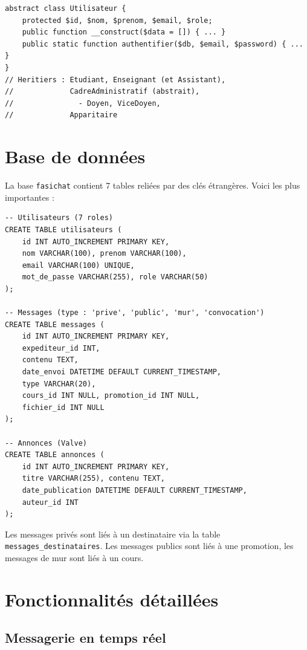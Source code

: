\documentclass[12pt,a4paper]{article}
\begin{document}
\begin{lstlisting}[style=phpphp, caption=Classes utilisateur]
abstract class Utilisateur {
    protected $id, $nom, $prenom, $email, $role;
    public function __construct($data = []) { ... }
    public static function authentifier($db, $email, $password) { ... }
}
// Heritiers : Etudiant, Enseignant (et Assistant),
//             CadreAdministratif (abstrait),
//               - Doyen, ViceDoyen,
//             Apparitaire
\end{lstlisting}

\section{Base de donn\'ees}

La base \texttt{fasichat} contient 7 tables reli\'ees par des cl\'es
\'etrang\`eres. Voici les plus importantes :

\begin{lstlisting}[style=monsql, caption=Tables principales]
-- Utilisateurs (7 roles)
CREATE TABLE utilisateurs (
    id INT AUTO_INCREMENT PRIMARY KEY,
    nom VARCHAR(100), prenom VARCHAR(100),
    email VARCHAR(100) UNIQUE,
    mot_de_passe VARCHAR(255), role VARCHAR(50)
);

-- Messages (type : 'prive', 'public', 'mur', 'convocation')
CREATE TABLE messages (
    id INT AUTO_INCREMENT PRIMARY KEY,
    expediteur_id INT,
    contenu TEXT,
    date_envoi DATETIME DEFAULT CURRENT_TIMESTAMP,
    type VARCHAR(20),
    cours_id INT NULL, promotion_id INT NULL,
    fichier_id INT NULL
);

-- Annonces (Valve)
CREATE TABLE annonces (
    id INT AUTO_INCREMENT PRIMARY KEY,
    titre VARCHAR(255), contenu TEXT,
    date_publication DATETIME DEFAULT CURRENT_TIMESTAMP,
    auteur_id INT
);
\end{lstlisting}

\noindent Les messages priv\'es sont li\'es \`a un destinataire via la table
\texttt{messages\_destinataires}. Les messages publics sont li\'es \`a une
promotion, les messages de mur sont li\'es \`a un cours.

\section{Fonctionnalit\'es d\'etaill\'ees}

\subsection{Messagerie en temps r\'eel}
\end{document}
